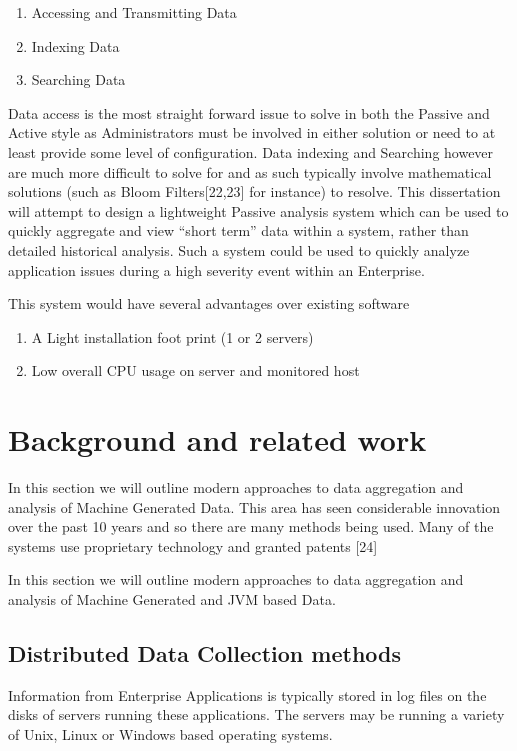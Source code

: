 \documentclass{llncs}
\begin{document}
\begin{enumerate}
  \item Accessing and Transmitting Data 
  \item Indexing Data
  \item Searching Data
\end{enumerate}

Data access is the most straight forward issue to solve in both the Passive and Active style as Administrators must be involved in either solution or need to at least provide some level of configuration. Data indexing and Searching however are much more difficult to solve for and as such typically involve mathematical solutions (such as Bloom Filters[22,23] for instance) to resolve. This dissertation will attempt to design a lightweight Passive analysis system which can be used to quickly aggregate and view “short term” data within a system, rather than detailed historical analysis. Such a system could be used to quickly analyze application issues during a high severity event within an Enterprise. 

This system would have several advantages over existing software

\begin{enumerate}
  \item A Light installation foot print (1 or 2 servers)
  \item Low overall CPU usage on server and monitored host
\end{enumerate}

\section{Background and related work}

In this section we will outline modern approaches to data aggregation and analysis of Machine Generated Data. This area has seen considerable innovation over the past 10 years and so there are many methods being used. Many of the systems use proprietary technology and granted patents [24]

In this section we will outline modern approaches to data aggregation and analysis of Machine Generated and JVM based Data.

\subsection{Distributed Data Collection methods}

Information from Enterprise Applications is typically stored in log files on the disks of servers running these applications. The servers may be running a variety of Unix, Linux or Windows based operating systems. 
\end{document}
